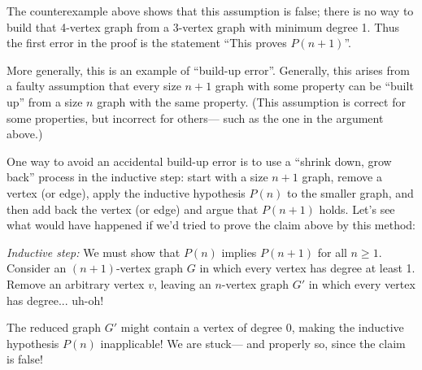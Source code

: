 \documentclass[12pt,twoside]{article}
\begin{document}
The counterexample above shows that this assumption is false; there is
no way to build that 4-vertex graph from a 3-vertex graph with minimum
degree 1.  Thus the first error in the proof is the statement ``This
proves $P(n+1)$''.

More generally, this is an example of ``build-up error''.  Generally,
this arises from a faulty assumption that every size $n+1$ graph with
some property can be ``built up'' from a size $n$ graph with the same
property.  (This assumption is correct for some properties, but
incorrect for others--- such as the one in the argument above.)

One way to avoid an accidental build-up error is to use a ``shrink
down, grow back'' process in the inductive step: start with a size
$n+1$ graph, remove a vertex (or edge), apply the inductive hypothesis
$P(n)$ to the smaller graph, and then add back the vertex (or edge)
and argue that $P(n+1)$ holds.  Let's see what would have happened if
we'd tried to prove the claim above by this method:

\noindent \textit{Inductive step:} We must show that $P(n)$ implies
$P(n+1)$ for all $n \geq 1$.  Consider an $(n+1)$-vertex graph $G$ in
which every vertex has degree at least 1.  Remove an arbitrary vertex
$v$, leaving an $n$-vertex graph $G'$ in which every vertex has
degree... uh-oh!

The reduced graph $G'$ might contain a vertex of degree 0, making the
inductive hypothesis $P(n)$ inapplicable!  We are stuck--- and
properly so, since the claim is false!
\end{document}
